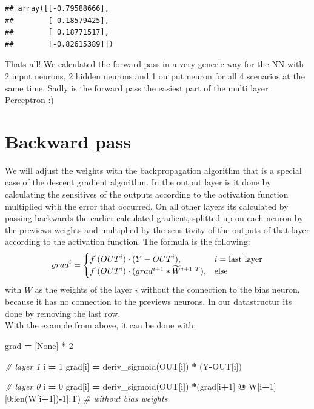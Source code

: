 \documentclass[
]{book}
\newenvironment{Shaded}{\begin{snugshade}}{\end{snugshade}}
\newcommand{\BuiltInTok}[1]{#1}
\newcommand{\CommentTok}[1]{\textcolor[rgb]{0.56,0.35,0.01}{\textit{#1}}}
\newcommand{\DecValTok}[1]{\textcolor[rgb]{0.00,0.00,0.81}{#1}}
\newcommand{\NormalTok}[1]{#1}
\newcommand{\OperatorTok}[1]{\textcolor[rgb]{0.81,0.36,0.00}{\textbf{#1}}}
\newcommand{\VariableTok}[1]{\textcolor[rgb]{0.00,0.00,0.00}{#1}}
\begin{document}
\begin{verbatim}
## array([[-0.79588666],
##        [ 0.18579425],
##        [ 0.18771517],
##        [-0.82615389]])
\end{verbatim}

Thats all! We calculated the forward pass in a very generic way for the NN with 2 input neurons, 2 hidden neurons and 1 output neuron for all 4 scenarios at the same time. Sadly is the forward pass the easiest part of the multi layer Perceptron :)

\hypertarget{backward-pass-1}{%
\section{Backward pass}\label{backward-pass-1}}

We will adjust the weights with the backpropagation algorithm that is a special case of the descent gradient algorithm. In the output layer is it done by calculating the sensitives of the outputs according to the activation function multiplied with the error that occurred. On all other layers its calculated by passing backwards the earlier calculated gradient, splitted up on each neuron by the previews weights and multiplied by the sensitivity of the outputs of that layer according to the activation function. The formula is the following:
\[
  grad^i= 
\begin{cases}
    f^`(OUT^i) \cdot (Y-OUT^i),& i =\text{last layer}\\
    f^`(OUT^i) \cdot (grad^{i+1} * \widetilde{W}^{i+1\ T}),& \text{else}
\end{cases}
\]
with \(\widetilde{W}\) as the weights of the layer \(i\) without the connection to the bias neuron, because it has no connection to the previews neurons. In our datastructur its done by removing the last row.\\
With the example from above, it can be done with:

\begin{Shaded}
\begin{Highlighting}[]
\NormalTok{grad }\OperatorTok{=}\NormalTok{ [}\VariableTok{None}\NormalTok{] }\OperatorTok{*} \DecValTok{2}

\CommentTok{\# layer 1}
\NormalTok{i }\OperatorTok{=} \DecValTok{1}
\NormalTok{grad[i] }\OperatorTok{=}\NormalTok{ deriv\_sigmoid(OUT[i]) }\OperatorTok{*}\NormalTok{ (Y}\OperatorTok{{-}}\NormalTok{OUT[i])}

\CommentTok{\# layer 0}
\NormalTok{i }\OperatorTok{=} \DecValTok{0}
\NormalTok{grad[i] }\OperatorTok{=}\NormalTok{ deriv\_sigmoid(OUT[i]) }\OperatorTok{*}\NormalTok{(grad[i}\OperatorTok{+}\DecValTok{1}\NormalTok{] }\OperatorTok{@}\NormalTok{ W[i}\OperatorTok{+}\DecValTok{1}\NormalTok{][}\DecValTok{0}\NormalTok{:}\BuiltInTok{len}\NormalTok{(W[i}\OperatorTok{+}\DecValTok{1}\NormalTok{])}\OperatorTok{{-}}\DecValTok{1}\NormalTok{].T) }\CommentTok{\# without bias weights}
\end{Highlighting}
\end{Shaded}
\end{document}
